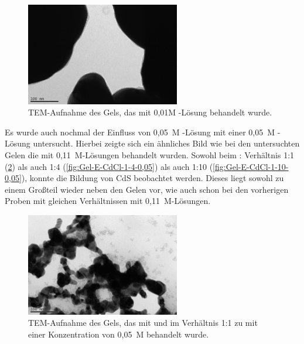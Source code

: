		\begin{figure}[H]
			\centering
			\includegraphics[width=0.6\textwidth]{Bilder/Gel-E-CdS-0,01} 	
			\caption{TEM-Aufnahme des Gels, das mit 0,01M -Lösung behandelt wurde.}
			\label{fig:Gel-E-CdS-0,01}
		\end{figure}
		
		Es wurde auch nochmal der Einfluss von  0,05~M -Lösung mit einer  0,05~M -Lösung untersucht.
		Hierbei zeigte sich ein ähnliches Bild wie bei den untersuchten Gelen die mit 0,11~M-Lösungen behandelt wurden.
		Sowohl beim  : Verhältnis 1:1 (\cref{fig:Gel-E-CdCl-1-1-0,05}) als auch 1:4 (\cref{fig:Gel-E-CdCl-1-4-0,05}) als auch 1:10 (\cref{fig:Gel-E-CdCl-1-10-0,05}), konnte die Bildung von CdS beobachtet werden.
		Dieses liegt sowohl zu einem Großteil wieder neben den Gelen vor, wie auch schon bei den vorherigen Proben mit gleichen Verhältnissen mit 0,11~M-Lösungen.
		
		\begin{figure}[H]
			\centering
			\includegraphics[width=0.6\textwidth]{Bilder/Gel-E-CdCl-1-1-0,05} 	
			\caption{TEM-Aufnahme des Gels, das mit  und  im Verhältnis 1:1  zu  mit einer Konzentration von 0,05~M behandelt wurde.}
			\label{fig:Gel-E-CdCl-1-1-0,05}
		\end{figure}
		
